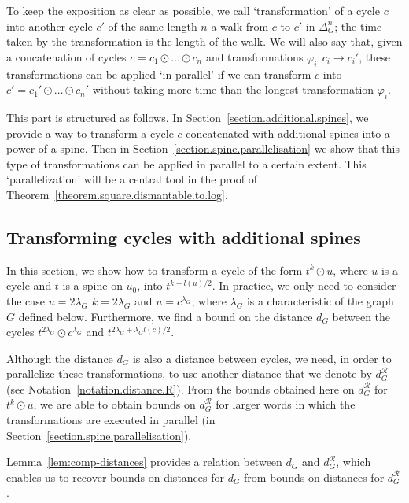 \documentclass{article}
\begin{document}
To keep the exposition as clear as possible, we call `transformation' of a cycle $c$ into another cycle $c'$ of the same length $n$ a walk from $c$ to $c'$ in $\Delta_G^n$; the time taken by the transformation is the length of the walk. We will also say that, given a concatenation of cycles $c = c_1\odot\dots\odot c_n$ and transformations $\varphi_i : c_i \to c_i'$, these transformations can be applied `in parallel' if we can transform $c$ into $c' = c_1'\odot\dots\odot c_n'$ without taking more time than the longest transformation $\varphi_i$.

This part is structured as follows. In Section~\ref{section.additional.spines}, we provide a way to transform a cycle $c$ concatenated with additional spines into a power of a spine. Then in Section~\ref{section.spine.parallelisation} we show that this type of transformations can be applied in parallel to a certain extent. This `parallelization' will be a central tool in the proof of Theorem~\ref{theorem.square.dismantable.to.log}.

\subsection{Transforming cycles with additional spines\label{section.additional.spines}}

In this section, we show how to transform a cycle of the form 
$t^k \odot u$, where $u$ is a cycle and $t$ is a spine on $u_0$, into $t^{k + l(u)/2}$. In practice, we only need to consider the case $u=2\lambda_G$ $k=2\lambda_G$ and $u=c^{\lambda_G}$, where $\lambda_G$ is a characteristic of the graph $G$ defined below. Furthermore, we find a bound on the distance $d_G$ between the cycles $t^{2\lambda_G} \odot c^{\lambda_G}$ and $t^{2\lambda_G + \lambda_G l(c)/2}$. 

Although the distance $d_G$ is also a distance between cycles, we need, in order to parallelize these 
transformations, to use another distance that we denote by $d_G^{\mathcal{R}}$ (see Notation~\ref{notation.distance.R}). From the bounds obtained here on $d_G^{\mathcal{R}}$ for $t^k \odot u$, we are able to obtain bounds on $d_G^{\mathcal{R}}$ for larger words in which 
the transformations are executed in parallel (in  Section~\ref{section.spine.parallelisation}). 

Lemma~\ref{lem:comp-distances} provides a relation between $d_G$ and $d_G^{\mathcal{R}}$, which enables us to recover 
bounds on distances for $d_G$ from bounds on distances for $d_G^{\mathcal{R}}$.
\end{document}
